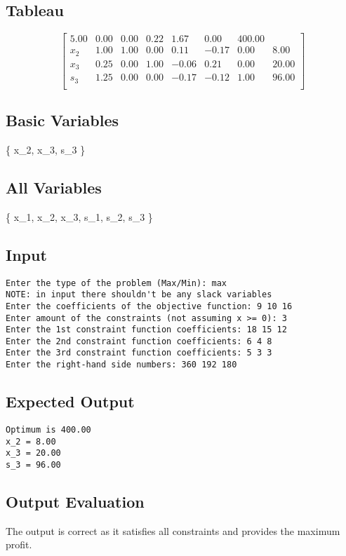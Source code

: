 \documentclass[12pt, legalpaper]{exam}
\begin{document}
\subsection*{Tableau}
\[
\begin{bmatrix}
    5.00 & 0.00 & 0.00 & 0.22 & 1.67 & 0.00 & 400.00 \\
    x_2 & 1.00 & 1.00 & 0.00 & 0.11 & -0.17 & 0.00 & 8.00 \\
    x_3 & 0.25 & 0.00 & 1.00 & -0.06 & 0.21 & 0.00 & 20.00 \\
    s_3 & 1.25 & 0.00 & 0.00 & -0.17 & -0.12 & 1.00 & 96.00 \\
\end{bmatrix}
\]
 
\subsection*{Basic Variables}
\{ x_2, x_3, s_3 \}
 
\subsection*{All Variables}
\{ x_1, x_2, x_3, s_1, s_2, s_3 \}
 
\subsection*{Input}
\begin{verbatim}
Enter the type of the problem (Max/Min): max
NOTE: in input there shouldn't be any slack variables
Enter the coefficients of the objective function: 9 10 16
Enter amount of the constraints (not assuming x >= 0): 3
Enter the 1st constraint function coefficients: 18 15 12
Enter the 2nd constraint function coefficients: 6 4 8
Enter the 3rd constraint function coefficients: 5 3 3
Enter the right-hand side numbers: 360 192 180
\end{verbatim}
 
\subsection*{Expected Output}
\begin{verbatim}
Optimum is 400.00
x_2 = 8.00
x_3 = 20.00
s_3 = 96.00
\end{verbatim}
 
\subsection*{Output Evaluation}
The output is correct as it satisfies all constraints and provides the maximum profit.
 
\end{document}
